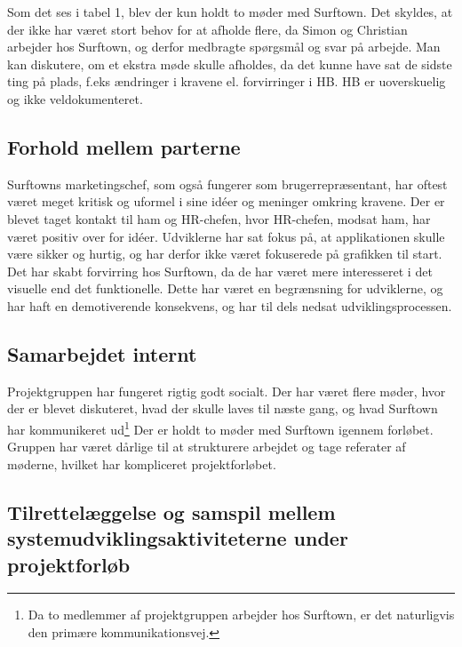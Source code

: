 \documentclass[12pt]{article}
\begin{document}
Som det ses i tabel 1, blev der kun holdt to møder med Surftown. Det skyldes, at der ikke har været stort behov for at afholde flere, da Simon og Christian arbejder hos Surftown, og derfor medbragte spørgsmål og svar på arbejde. Man kan diskutere, om et ekstra møde skulle afholdes, da det kunne have sat de sidste ting på plads, f.eks ændringer i kravene el. forvirringer i HB. HB er uoverskuelig og ikke veldokumenteret. 

\subsection{Forhold mellem parterne}
Surftowns marketingschef, som også fungerer som brugerrepræsentant, har oftest været meget kritisk og uformel i sine idéer og meninger omkring kravene. Der er blevet taget kontakt til ham og HR-chefen, hvor HR-chefen, modsat ham, har været positiv over for idéer. Udviklerne har sat fokus på, at applikationen skulle være sikker og hurtig, og har derfor ikke været fokuserede på grafikken til start. Det har skabt forvirring hos Surftown, da de har været mere interesseret i det visuelle end det funktionelle. Dette har været en begrænsning for udviklerne, og har haft en demotiverende konsekvens, og har til dels nedsat udviklingsprocessen. 


\subsection {Samarbejdet internt}
Projektgruppen har fungeret rigtig godt socialt. Der har været flere møder, hvor der er blevet diskuteret, hvad der skulle laves til næste gang, og hvad Surftown har kommunikeret ud\footnote{Da to medlemmer af projektgruppen arbejder hos Surftown, er det naturligvis den primære kommunikationsvej.}
Der er holdt to møder med Surftown igennem forløbet.
Gruppen har været dårlige til at strukturere arbejdet og tage referater af møderne, hvilket har kompliceret projektforløbet. 

\subsection {Tilrettelæggelse og samspil mellem systemudviklingsaktiviteterne under projektforløb}
\end{document}
